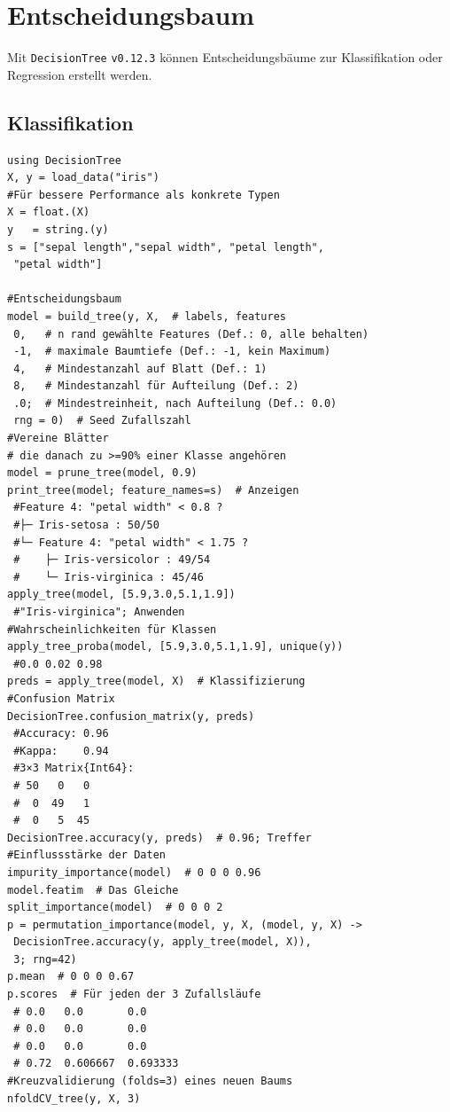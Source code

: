 \documentclass[10pt,twocolumn]{scrartcl}
\begin{document}
\section{Entscheidungsbaum}

Mit \lstinline|DecisionTree| \lstinline|v0.12.3| können Entscheidungsbäume zur
Klassifikation oder Regression erstellt werden.

\subsection{Klassifikation}

\begin{lstlisting}
using DecisionTree
X, y = load_data("iris")
#Für bessere Performance als konkrete Typen
X = float.(X)
y   = string.(y)
s = ["sepal length","sepal width", "petal length",
 "petal width"]

#Entscheidungsbaum
model = build_tree(y, X,  # labels, features
 0,   # n rand gewählte Features (Def.: 0, alle behalten)
 -1,  # maximale Baumtiefe (Def.: -1, kein Maximum)
 4,   # Mindestanzahl auf Blatt (Def.: 1)
 8,   # Mindestanzahl für Aufteilung (Def.: 2)
 .0;  # Mindestreinheit, nach Aufteilung (Def.: 0.0)
 rng = 0)  # Seed Zufallszahl
#Vereine Blätter
# die danach zu >=90% einer Klasse angehören
model = prune_tree(model, 0.9)
print_tree(model; feature_names=s)  # Anzeigen
 #Feature 4: "petal width" < 0.8 ?
 #├─ Iris-setosa : 50/50
 #└─ Feature 4: "petal width" < 1.75 ?
 #    ├─ Iris-versicolor : 49/54
 #    └─ Iris-virginica : 45/46
apply_tree(model, [5.9,3.0,5.1,1.9])
 #"Iris-virginica"; Anwenden
#Wahrscheinlichkeiten für Klassen
apply_tree_proba(model, [5.9,3.0,5.1,1.9], unique(y))
 #0.0 0.02 0.98
preds = apply_tree(model, X)  # Klassifizierung
#Confusion Matrix
DecisionTree.confusion_matrix(y, preds)
 #Accuracy: 0.96
 #Kappa:    0.94
 #3×3 Matrix{Int64}:
 # 50   0   0
 #  0  49   1
 #  0   5  45
DecisionTree.accuracy(y, preds)  # 0.96; Treffer
#Einflussstärke der Daten
impurity_importance(model)  # 0 0 0 0.96
model.featim  # Das Gleiche
split_importance(model)  # 0 0 0 2
p = permutation_importance(model, y, X, (model, y, X) ->
 DecisionTree.accuracy(y, apply_tree(model, X)),
 3; rng=42)
p.mean  # 0 0 0 0.67
p.scores  # Für jeden der 3 Zufallsläufe
 # 0.0   0.0       0.0
 # 0.0   0.0       0.0
 # 0.0   0.0       0.0
 # 0.72  0.606667  0.693333
#Kreuzvalidierung (folds=3) eines neuen Baums
nfoldCV_tree(y, X, 3)


\end{lstlisting}
\end{document}
